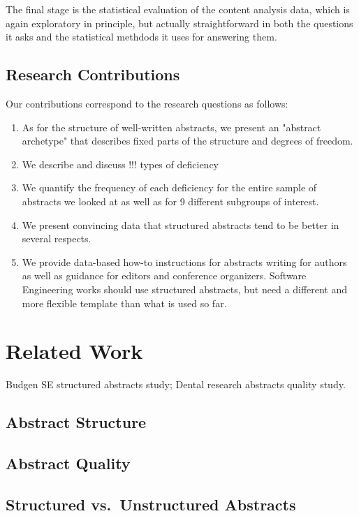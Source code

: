 \documentclass[10pt,journal,compsoc]{IEEEtran}
\begin{document}
The final stage is the statistical evaluation of the content analysis data,
which is again exploratory in principle, but actually straightforward in both
the questions it asks and the statistical methdods it uses for answering them.


\subsection{Research Contributions}

Our contributions correspond to the research questions as follows:
\begin{enumerate}
	\item As for the structure of well-written abstracts, we present an "abstract archetype"
	  that describes fixed parts of the structure and degrees of freedom. 
	\item We describe and discuss !!! types of deficiency 
	\item We quantify the frequency of each deficiency for the entire sample of abstracts
	  we looked at as well as for 9 different subgroups of interest.
	\item We present convincing data that structured abstracts tend to be better 
	  in several respects.
	\item We provide data-based how-to instructions for abstracts writing for authors
	  as well as guidance for editors and conference organizers.
	  Software Engineering works should use structured abstracts, but
	  need a different and more flexible template than what is used so far.
\end{enumerate}


\section{Related Work}

Budgen SE structured abstracts study; Dental research abstracts quality study.

\subsection{Abstract Structure}


\subsection{Abstract Quality}


\subsection{Structured vs.\ Unstructured Abstracts}
\end{document}

